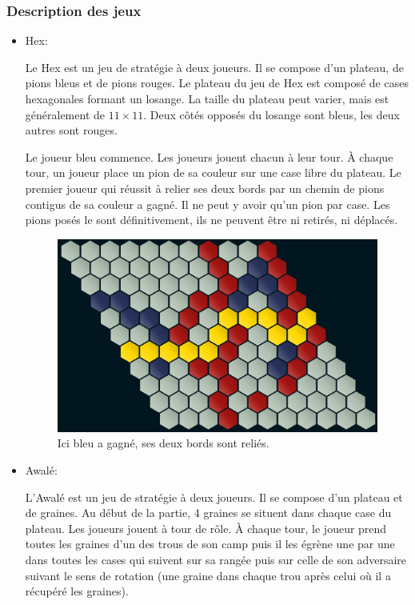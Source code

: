 \subsubsection{Description des jeux}
\begin{itemize}
    \item Hex:
    
    Le Hex est un jeu de stratégie à deux joueurs. Il se compose d'un plateau, de pions bleus
    et de pions rouges. Le plateau du jeu de Hex est composé de cases hexagonales formant un losange. La taille
    du plateau peut varier, mais est généralement de $11\times 11$. Deux côtés opposés du losange sont bleus, les deux 
    autres sont rouges. 

    Le joueur bleu commence. Les joueurs jouent chacun à leur tour. À chaque tour, un joueur place un pion de sa couleur sur une 
    case libre du plateau. Le premier joueur qui réussit à relier ses deux bords par un chemin de pions contigus de sa couleur
    a gagné. Il ne peut y avoir qu'un pion par case. Les pions posés le sont définitivement, ils ne peuvent être ni retirés, ni
    déplacés.\\
    \begin{figure}[h]
        \begin{center}
            \includegraphics[scale=0.5]{root/hex_jeu_bleu}
        \end{center}
        \caption{Ici bleu a gagné, ses deux bords sont reliés.}\label{fig:hex_jeu_bleu}
    \end{figure}
    

    \item Awalé:
    
    L'Awalé est un jeu de stratégie à deux joueurs. Il se compose d'un plateau et de graines. Au début de la partie, 4 graines se 
    situent dans chaque case du plateau. Les joueurs jouent à tour de rôle. À chaque tour, le joueur prend toutes les graines d’un 
    des trous de son camp puis il les égrène une par une dans toutes les cases qui suivent sur sa rangée puis sur celle de son adversaire 
    suivant le sens de rotation (une graine dans chaque trou après celui où il a récupéré les graines).


\end{itemize}
